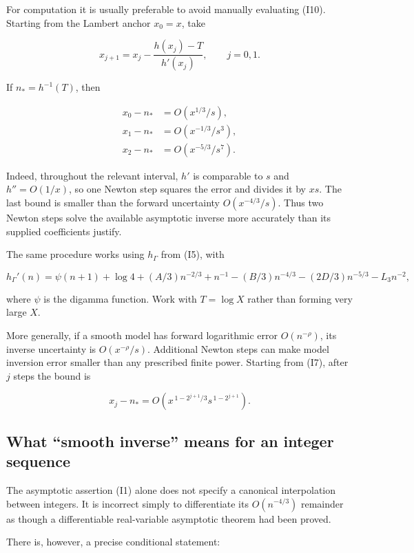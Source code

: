 \documentclass[11pt,letterpaper]{article}
\numberwithin{equation}{section}
\theoremstyle{remark}
\begin{document}
For computation it is usually preferable to avoid manually evaluating (I10). Starting from the Lambert anchor \(x_0=x\), take

\[
x_{j+1}=x_j-\frac{h(x_j)-T}{h'(x_j)},\qquad j=0,1.
\tag{I13}
\]

If \(n_*=h^{-1}(T)\), then

\[
\begin{aligned}
x_0-n_*&=O(x^{1/3}/s),\\
x_1-n_*&=O(x^{-1/3}/s^3),\\
x_2-n_*&=O(x^{-5/3}/s^7).
\end{aligned}
\tag{I14}
\]

Indeed, throughout the relevant interval, \(h'\) is comparable to \(s\) and \(h''=O(1/x)\), so one Newton step squares the error and divides it by \(xs\). The last bound is smaller than the forward uncertainty \(O(x^{-4/3}/s)\). Thus two Newton steps solve the available asymptotic inverse more accurately than its supplied coefficients justify.

The same procedure works using \(h_\Gamma\) from (I5), with

\[
h_\Gamma'(n)=\psi(n+1)+\log4+(A/3)n^{-2/3}+n^{-1}
-(B/3)n^{-4/3}-(2D/3)n^{-5/3}-L_3n^{-2},
\]

where \(\psi\) is the digamma function. Work with \(T=\log X\) rather than forming very large \(X\).

More generally, if a smooth model has forward logarithmic error \(O(n^{-\rho})\), its inverse uncertainty is \(O(x^{-\rho}/s)\). Additional Newton steps can make model inversion error smaller than any prescribed finite power. Starting from (I7), after \(j\) steps the bound is

\[
x_j-n_*=O\!\left(x^{\,1-2^{j+1}/3}s^{\,1-2^{j+1}}\right).
\]

\subsection{What ``smooth inverse'' means for an integer sequence}\label{air:rb:what-smooth-inverse-means-for-an-integer-sequence}

The asymptotic assertion (I1) alone does not specify a canonical interpolation between integers. It is incorrect simply to differentiate its \(O(n^{-4/3})\) remainder as though a differentiable real-variable asymptotic theorem had been proved.

There is, however, a precise conditional statement:
\end{document}
